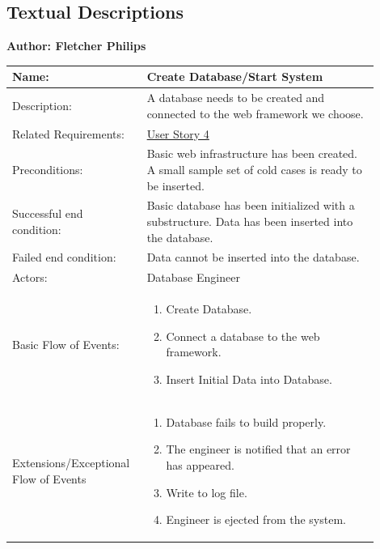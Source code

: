 \documentclass[11pt]{article}
\begin{document}
\subsection{Textual Descriptions}

\begin{table}[!ht]
\begin{center}
\textbf{Author: Fletcher Philips}
\vspace*{1em}

\begin{tabular}{p{0.30\linewidth}p{0.60\linewidth}}
	Name: & Create Database/Start System\\\hline
	Description: & A database needs to be created and connected to the web framework we choose.\\\hline
	Related Requirements:& \hyperlink{us4}{User Story 4}\\\hline
	Preconditions:& Basic web infrastructure has been created. A small sample set of cold cases is ready to be inserted.\\\hline
	Successful end condition:& Basic database has been initialized with a substructure. Data has been inserted into the database.\\\hline
	Failed end condition:& Data cannot be inserted into the database.\\\hline
	Actors:& Database Engineer\\\hline
	Basic Flow of Events: & \begin{enumerate}
	\item Create Database.
	\item Connect a database to the web framework.
	\item Insert Initial Data into Database.
	\end{enumerate}\\\hline
	Extensions/Exceptional Flow of Events & \begin{enumerate}
	\item Database fails to build properly.
	\item The engineer is notified that an error has appeared.
	\item Write to log file.
	\item Engineer is ejected from the system.
	\end{enumerate}
\end{tabular}
\label{des:create_database}	
\end{center}
\end{table}
\end{document}
